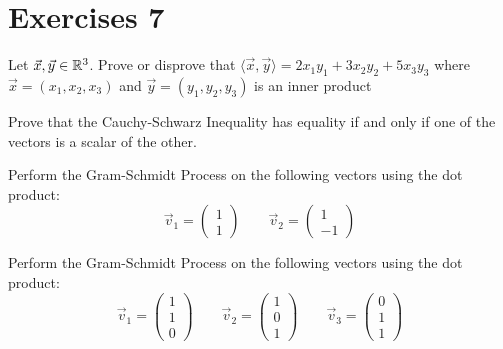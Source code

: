 \section{Exercises 7}
\begin{exercise}
    Let $\vec{x},\vec{y}\in\mathbb{R}^3$. Prove or disprove that $\langle\vec{x},\vec{y}\rangle=2x_1y_1+3x_2y_2+5x_3y_3$ where $\vec{x}=(x_1, x_2,x_3)$ and $\vec{y}=(y_1,y_2,y_3)$ is an inner product
\end{exercise}
\begin{exercise}
    Prove that the Cauchy-Schwarz Inequality has equality if and only if one of the vectors is a scalar of the other.
\end{exercise}
\begin{exercise}
    Perform the Gram-Schmidt Process on the following vectors using the dot product:
    $$\vec{v}_1=\begin{pmatrix}
        1 \\ 1
    \end{pmatrix}\quad\quad\vec{v}_2=\begin{pmatrix}
        1 \\ -1
    \end{pmatrix}$$
\end{exercise}
\begin{exercise}
    Perform the Gram-Schmidt Process on the following vectors using the dot product:
    $$\vec{v}_1=\begin{pmatrix}
        1 \\ 1 \\ 0
    \end{pmatrix}\quad\quad\vec{v}_2=\begin{pmatrix}
        1 \\ 0 \\ 1
    \end{pmatrix}\quad\quad\vec{v}_3=\begin{pmatrix}
        0 \\ 1 \\ 1
    \end{pmatrix}$$
\end{exercise}